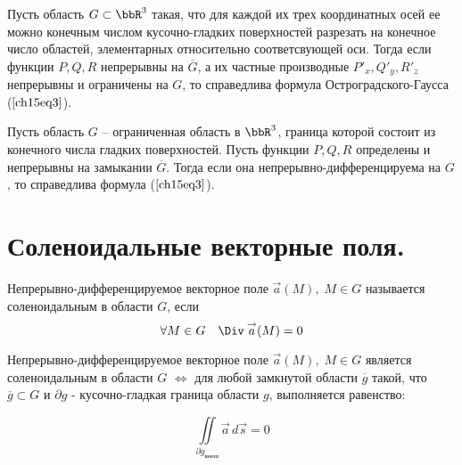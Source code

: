 \begin{thm}
Пусть область $G \subset \bbR^3$ такая, что для каждой их трех координатных осей ее можно конечным числом кусочно-гладких поверхностей разрезать на конечное число областей, элементарных относительно соответсвующей оси. Тогда если функции $P,Q,R$ непрерывны на $\overline{G}$, а их частные производные $P'_x, Q'_y, R'_z$ непрерывны и ограничены на $G$, то справедлива формула Остроградского-Гаусса ($\ref{ch15eq3}$).
\end{thm}

\begin{thm}
Пусть область $G$ -- ограниченная область в $\bbR^3$, граница которой состоит из конечного числа гладких поверхностей. Пусть функции $P,Q,R$ определены и непрерывны на замыкании $\overline{G}$. Тогда если она непрерывно-дифференцируема на $G$, то справедлива формула ($\ref{ch15eq3}$).
\end{thm}
\section{Соленоидальные векторные поля.}

\begin{defn}
Непрерывно-дифференцируемое векторное поле $\overset{\to}{a}(M), \; M \in G$ называется соленоидальным в области $G$, если 
\begin{equation} \label{ch15.2eq1}
\forall M \in G \quad \Div \: \overset{\to}{a}(M) = 0
\end{equation}
\end{defn}

\begin{thm}
Непрерывно-дифференцируемое векторное поле $\overset{\to}{a}(M), \; M \in G$ является соленоидальным в области $G$ $\Leftrightarrow$ для любой замкнутой области $\overline{g}$ такой, что $\overline{g} \subset G$ и $\partial g$ - кусочно-гладкая граница области $g$, выполняется равенство:

\begin{equation} \label{ch15.2eq2}
\iint\limits_{\partial g_{\textit{внеш}}} \overset{\to}{a} \,d\overset{\to}{s} = 0
\end{equation}
\end{thm}

